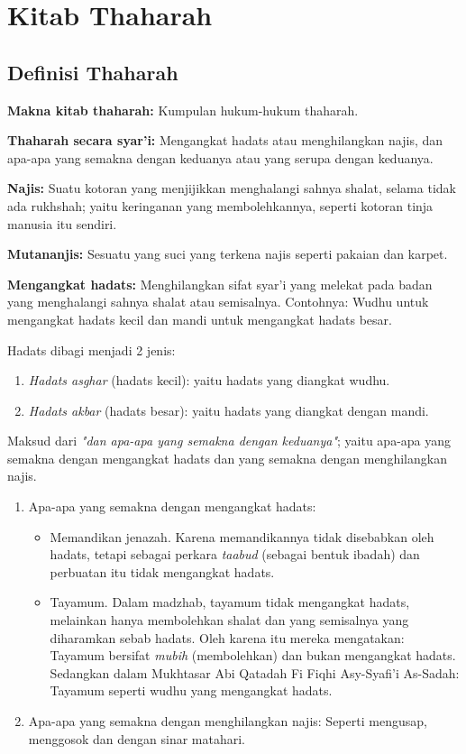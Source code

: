 \chapter{Kitab Thaharah}

\section{Definisi Thaharah}

\textbf{Makna kitab thaharah:} Kumpulan hukum-hukum thaharah.

\textbf{Thaharah secara syar'i:} Mengangkat hadats atau menghilangkan najis, dan apa-apa yang semakna dengan keduanya atau yang serupa dengan keduanya.

\textbf{Najis:} Suatu kotoran yang menjijikkan menghalangi sahnya shalat, selama tidak ada rukhshah; yaitu keringanan yang membolehkannya, seperti kotoran tinja manusia itu sendiri.

\textbf{Mutananjis:} Sesuatu yang suci yang terkena najis seperti pakaian dan karpet.

\textbf{Mengangkat hadats:} Menghilangkan sifat syar'i yang melekat pada badan yang menghalangi sahnya shalat atau semisalnya. Contohnya: Wudhu untuk mengangkat hadats kecil dan mandi untuk mengangkat hadats besar. 

Hadats dibagi menjadi 2 jenis:
\begin{enumerate} 
    \item \textit{Hadats asghar} (hadats kecil): yaitu hadats yang diangkat wudhu.
    \item \textit{Hadats akbar} (hadats besar): yaitu hadats yang diangkat dengan mandi.
\end{enumerate}

Maksud dari \textit{"dan apa-apa yang semakna dengan keduanya"}; yaitu apa-apa yang semakna dengan mengangkat hadats dan yang semakna dengan menghilangkan najis.

\begin{enumerate}
    \item Apa-apa yang semakna dengan mengangkat hadats:
    \begin{itemize}
        \item Memandikan jenazah. Karena memandikannya tidak disebabkan oleh hadats, tetapi sebagai perkara \textit{taabud} (sebagai bentuk ibadah) dan perbuatan itu tidak mengangkat hadats.
        \item Tayamum. Dalam madzhab, tayamum tidak mengangkat hadats, melainkan hanya membolehkan shalat dan yang semisalnya yang diharamkan sebab hadats. Oleh karena itu mereka mengatakan: Tayamum bersifat \textit{mubih} (membolehkan) dan bukan mengangkat hadats. Sedangkan dalam Mukhtasar Abi Qatadah Fi Fiqhi Asy-Syafi’i As-Sadah: Tayamum seperti wudhu yang mengangkat hadats.
    \end{itemize} 
    \item Apa-apa yang semakna dengan menghilangkan najis: Seperti mengusap, menggosok dan dengan sinar matahari.
\end{enumerate}
	
